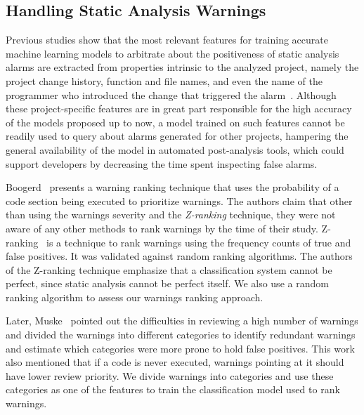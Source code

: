 
\subsection{Handling Static Analysis Warnings}

Previous studies show that the most relevant features for training accurate
machine learning models to arbitrate about the positiveness of static analysis
alarms are extracted from properties intrinsic to the analyzed project,
namely the project change history, function and file names, and even the name
of the programmer who introduced the change that triggered the
alarm~\cite{kremenek2004correlation, heckman2009model, jung2005taming,
ruthruff_predicting_2008, yoon2014reducing}. Although these project-specific
features are in great part responsible for the high accuracy of the models
proposed up to now, a model trained on such features cannot be readily used to
query about alarms generated for other projects, hampering the general
availability of the model in automated post-analysis tools, which could
support developers by decreasing the time spent inspecting false alarms.

Boogerd~\cite{boogerd2006prioritizing} presents a warning ranking technique
that uses the probability of a code section being executed to prioritize
warnings. The authors claim that other than using the warnings severity and the
\textit{Z-ranking} technique, they were not aware of any other methods to rank
warnings by the time of their study. Z-ranking~\cite{kremenek2003z} is a
technique to rank warnings using the frequency counts of true and false
positives. It was validated against random ranking algorithms. The
authors of the Z-ranking technique emphasize that a classification system
cannot be perfect, since static analysis cannot be perfect itself.
We also use a random ranking algorithm to assess our warnings ranking approach.

Later, Muske~\cite{muske2013review} pointed out the difficulties in reviewing a high
number of warnings and divided the warnings into different categories to identify
redundant warnings and estimate which categories were more prone to hold false
positives. This work also mentioned that if a code is never executed,
warnings pointing at it should have lower review priority.
We divide warnings into categories and use these categories as one of the features
to train the classification model used to rank warnings.

